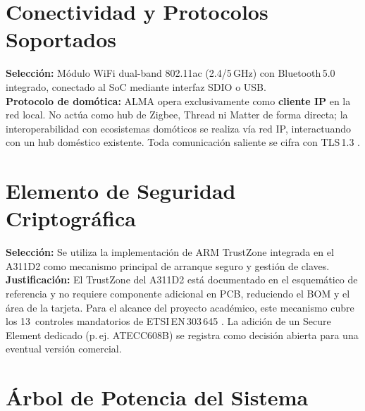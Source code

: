 \section{Conectividad y Protocolos Soportados}
\label{sec:arq_conectividad}

\begin{decisbox}
  \textbf{Selección:} Módulo WiFi dual-band 802.11ac (2.4/5\,GHz) con Bluetooth\,5.0 integrado,
  conectado al SoC mediante interfaz SDIO o USB.\\[4pt]
  \textbf{Protocolo de domótica:} ALMA opera exclusivamente como \textbf{cliente IP}
  en la red local. No actúa como hub de Zigbee, Thread ni Matter de forma directa;
  la interoperabilidad con ecosistemas domóticos se realiza vía red IP, interactuando
  con un hub doméstico existente. Toda comunicación saliente se cifra con TLS\,1.3
  .
\end{decisbox}

\section{Elemento de Seguridad Criptográfica}
\label{sec:arq_seguridad}

\begin{decisbox}
  \textbf{Selección:} Se utiliza la implementación de ARM TrustZone integrada en
  el A311D2 como mecanismo principal de arranque seguro y gestión de claves.\\[4pt]
  \textbf{Justificación:} El TrustZone del A311D2 está documentado en el esquemático
  de referencia y no requiere componente adicional en PCB, reduciendo el BOM y el área
  de la tarjeta. Para el alcance del proyecto académico, este mecanismo cubre los
  13~controles mandatorios de ETSI\,EN\,303\,645 . La adición de
  un Secure Element dedicado (p.\,ej. ATECC608B) se registra como decisión abierta
  para una eventual versión comercial.
\end{decisbox}

\section{Árbol de Potencia del Sistema}
\label{sec:arq_potencia}


